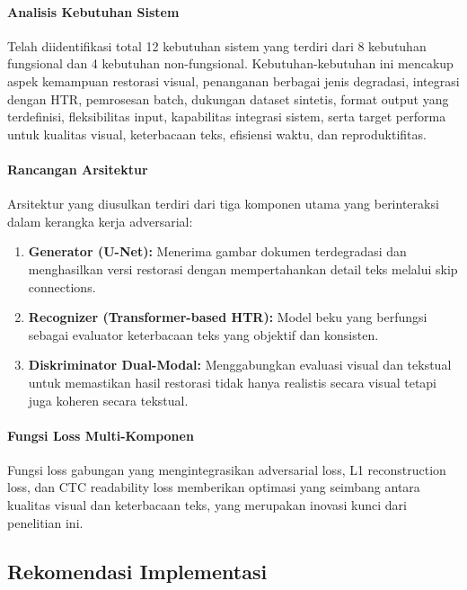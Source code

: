 \documentclass[12pt,a4paper]{article}
\begin{document}
\paragraph{Analisis Kebutuhan Sistem}
Telah diidentifikasi total 12 kebutuhan sistem yang terdiri dari 8 kebutuhan fungsional dan 4 kebutuhan non-fungsional. Kebutuhan-kebutuhan ini mencakup aspek kemampuan restorasi visual, penanganan berbagai jenis degradasi, integrasi dengan HTR, pemrosesan batch, dukungan dataset sintetis, format output yang terdefinisi, fleksibilitas input, kapabilitas integrasi sistem, serta target performa untuk kualitas visual, keterbacaan teks, efisiensi waktu, dan reproduktifitas.

\paragraph{Rancangan Arsitektur}
Arsitektur yang diusulkan terdiri dari tiga komponen utama yang berinteraksi dalam kerangka kerja adversarial:

\begin{enumerate}
    \item \textbf{Generator (U-Net):} Menerima gambar dokumen terdegradasi dan menghasilkan versi restorasi dengan mempertahankan detail teks melalui skip connections.

    \item \textbf{Recognizer (Transformer-based HTR):} Model beku yang berfungsi sebagai evaluator keterbacaan teks yang objektif dan konsisten.

    \item \textbf{Diskriminator Dual-Modal:} Menggabungkan evaluasi visual dan tekstual untuk memastikan hasil restorasi tidak hanya realistis secara visual tetapi juga koheren secara tekstual.
\end{enumerate}

\paragraph{Fungsi Loss Multi-Komponen}
Fungsi loss gabungan yang mengintegrasikan adversarial loss, L1 reconstruction loss, dan CTC readability loss memberikan optimasi yang seimbang antara kualitas visual dan keterbacaan teks, yang merupakan inovasi kunci dari penelitian ini.

\subsection{Rekomendasi Implementasi}
\end{document}
